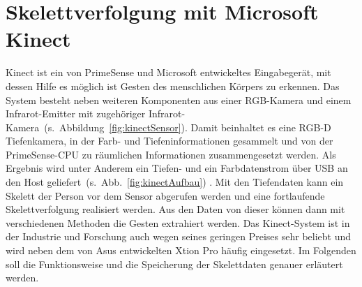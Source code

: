 \section{Skelettverfolgung mit Microsoft Kinect}\label{Tracking}
Kinect ist ein von PrimeSense und Microsoft entwickeltes Eingabegerät, mit dessen Hilfe es möglich ist Gesten des menschlichen Körpers zu erkennen. Das System besteht neben weiteren Komponenten aus einer RGB-Kamera und einem Infrarot-Emitter mit zugehöriger Infrarot-Kamera~(s.~Abbildung~\ref{fig:kinectSensor}). Damit beinhaltet es eine RGB-D Tiefenkamera, in der Farb- und Tiefeninformationen gesammelt und von der PrimeSense-CPU zu räumlichen Informationen zusammengesetzt werden. Als Ergebnis wird unter Anderem ein Tiefen- und ein Farbdatenstrom über USB an den Host geliefert~(s.~Abb.~\ref{fig:kinectAufbau}) \cite{hannaKinect1}. Mit den Tiefendaten kann ein Skelett der Person vor dem Sensor abgerufen werden und eine fortlaufende Skelettverfolgung realisiert werden. Aus den Daten von dieser können dann mit verschiedenen Methoden die Gesten extrahiert werden. Das Kinect-System ist in der Industrie und Forschung auch wegen seines geringen Preises sehr beliebt und wird neben dem von Asus entwickelten Xtion Pro häufig eingesetzt. Im Folgenden soll die Funktionsweise und die Speicherung der Skelettdaten genauer erläutert werden.~\cite{cruzkinect}


